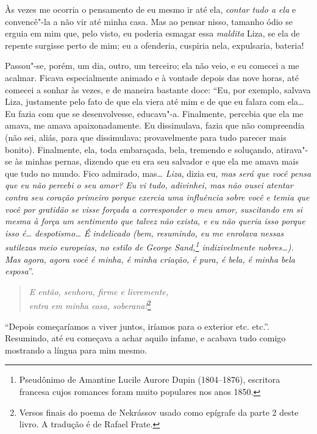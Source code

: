 Às vezes me ocorria o pensamento de eu mesmo ir até ela, \textit{contar tudo a
ela} e convencê"-la a não vir até minha casa. Mas ao pensar nisso,
tamanho ódio se erguia em mim que, pelo visto, eu poderia esmagar essa
\textit{maldita} Liza, se ela de repente surgisse perto de mim; eu a
ofenderia, cuspiria nela, expulsaria, bateria!

Passou"-se, porém, um dia, outro, um terceiro; ela não veio, e eu comecei
a me acalmar. Ficava especialmente animado e à vontade depois das nove
horas, até comecei a sonhar às vezes, e de maneira bastante doce: ``Eu,
por exemplo, salvava Liza, justamente pelo fato de que ela viera até
mim e de que eu falara com ela\ldots{} Eu fazia com que se desenvolvesse,
educava"-a. Finalmente, percebia que ela me amava, me amava
apaixonadamente. Eu dissimulava, fazia que não compreendia (não sei,
aliás, para que dissimulava; provavelmente para tudo parecer mais
bonito). Finalmente, ela, toda embaraçada, bela, tremendo e soluçando,
atirava"-se às minhas pernas, dizendo que eu era seu salvador e que ela
me amava mais que tudo no mundo. Fico admirado, mas\ldots{} \textit{Liza}, dizia
eu, \textit{mas será que você pensa que eu não percebi o seu amor? Eu vi tudo,
adivinhei, mas não ousei atentar contra seu coração primeiro porque
exercia uma influência sobre você e temia que você por gratidão se
visse forçada a corresponder o meu amor, suscitando em si mesma à força um 
sentimento que talvez não exista, e eu não queria isso porque
isso é\ldots{} despotismo\ldots{} É indelicado (bem, resumindo, eu me enrolava
nessas sutilezas meio europeias, no estilo de George Sand,\footnote{
Pseudônimo de Amantine Lucile Aurore Dupin (1804--1876), escritora
francesa cujos romances foram muito populares nos anos 1850.}
indizivelmente nobres\ldots{}). Mas agora, agora você é minha, é minha
criação, é pura, é bela, é minha bela esposa}''.


\begin{verse}
\textit{E então, senhora, firme e livremente,\\
entra em minha casa, soberana!}\footnote{Versos finais do poema de
Nekrássov usado como epígrafe da parte 2 deste livro. A tradução é de Rafael
Frate.}
\end{verse}


``Depois começaríamos a viver juntos, iríamos para o exterior etc. etc.''.
Resumindo, até eu começava a achar aquilo infame, e acabava tudo comigo
mostrando a língua para mim mesmo.

